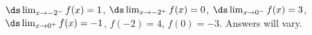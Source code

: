 {$\ds \lim_{x\to -2^-} f(x)=1$, \quad  $\ds \lim_{x\to-2^+} f(x)=0$, \quad $\ds \lim_{x\to 0^-} f(x)=3$, \quad $\ds \lim_{x\to 0^+} f(x)=-1$, \quad $f(-2)=4$, \quad $f(0)=-3$.}
{Answers will vary.}
